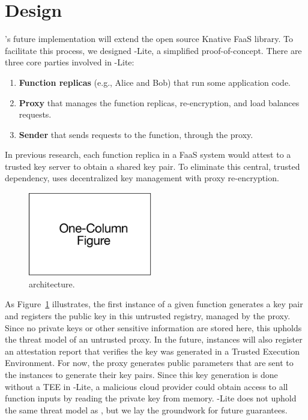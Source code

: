 \section{Design}
\label{sec:design}



\SystemName's future implementation will extend the open source Knative FaaS library.
To facilitate this process, we designed \SystemName-Lite, a simplified proof-of-concept.
There are three core parties involved in \SystemName-Lite:
\begin{enumerate}
	\item \textbf{Function replicas} (e.g., Alice and Bob) that run some application code.
	\item \textbf{Proxy} that manages the function replicas, re-encryption, and load balances requests.
	\item \textbf{Sender} that sends requests to the function, through the proxy.
\end{enumerate}

In previous research, each function replica in a FaaS system would attest to a trusted key
server to obtain a shared key pair.
%
To eliminate this central, trusted dependency, \SystemName
uses decentralized key management with proxy re-encryption.
%
\begin{figure}
    \centering
    \includegraphics[page = 4, width=0.48\textwidth]{diagrams/slides.pdf}
    \caption{\SystemName architecture.}
    \label{fig:arch}
\end{figure}
%
As Figure~\ref{fig:arch} illustrates, the first instance of a given function
generates a key pair and registers the public key in this untrusted registry, managed by the proxy.
Since no private keys or other sensitive information are stored here, this upholds the threat model of an untrusted proxy.
In the future, instances will also register an attestation report that verifies the key was generated in a Trusted Execution Environment\@.
For now, the proxy generates public parameters that are sent to the instances to generate their key pairs.
Since this key generation is done without a TEE in \SystemName-Lite, a malicious cloud provider could obtain access to all function inputs by reading the private key from memory.
\SystemName-Lite does not uphold the same threat model as \SystemName, but we lay the groundwork for future guarantees.

